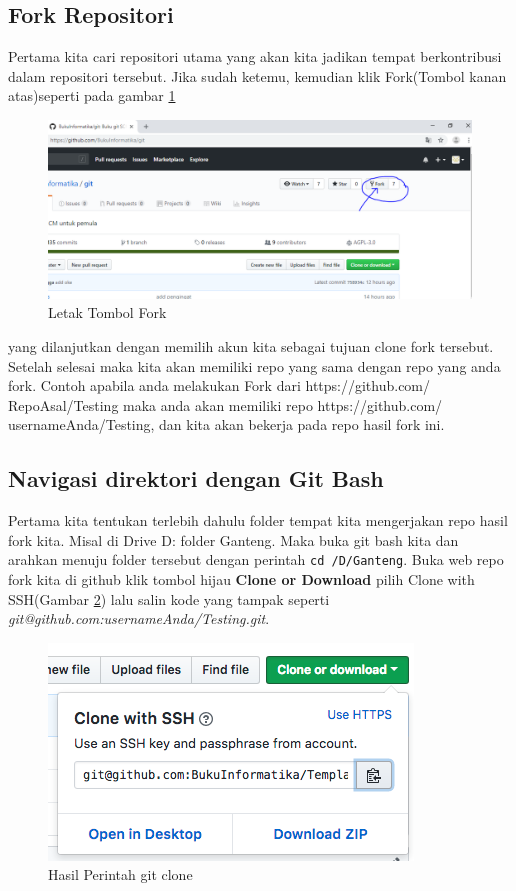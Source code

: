 \subsection{Fork Repositori}
Pertama kita cari repositori utama yang akan kita jadikan tempat berkontribusi dalam repositori tersebut. Jika sudah ketemu, kemudian klik Fork(Tombol kanan atas)seperti pada gambar \ref{fork}
  \begin{figure}[!htbp]
        \centering
            \includegraphics[width=.85\textwidth]{Figures/Click-Fork}
            \caption{Letak Tombol Fork}
        \label{fork}
    \end{figure}
yang dilanjutkan dengan memilih akun kita sebagai tujuan clone fork tersebut. Setelah selesai maka kita akan memiliki repo yang sama dengan repo yang anda fork. Contoh apabila anda melakukan Fork dari https://github.com/ RepoAsal/Testing maka anda akan memiliki repo https://github.com/ usernameAnda/Testing, dan kita akan bekerja pada repo hasil fork ini.


\subsection{Navigasi direktori dengan Git Bash}
Pertama kita tentukan terlebih dahulu folder tempat kita mengerjakan repo hasil fork kita. Misal di Drive D: folder Ganteng. Maka buka git bash kita dan arahkan menuju folder tersebut dengan perintah 
\verb|cd /D/Ganteng|.
Buka web repo fork kita di github klik tombol hijau \textbf{Clone or Download} pilih Clone with SSH(Gambar \ref{fig:clone1}) lalu salin kode yang tampak seperti \textit{git@github.com:usernameAnda/Testing.git}. 

\begin{figure}[!htbp]
\centerline{\includegraphics[width=.75\textwidth]{Figures/clone1}}
\caption{Hasil Perintah git clone}
\label{fig:clone1}
\end{figure}

